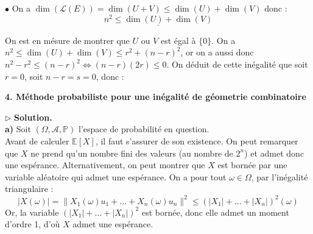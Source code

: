 \documentclass[11pt,a4paper]{article}
\begin{document}
\noindent $\bullet$ On a $\dim(\mathcal{L}(E)) = \dim(U+V) \leqslant \dim(U) + \dim(V)$ donc :
$$ \underline{n^2 \leqslant \dim(U) + \dim(V)} $$

\noindent On est en mésure de montrer que $U$ ou $V$ est égal à $\{0\}$. On a $n^2 \leqslant \dim(U) + \dim(V) \leqslant r^2 + (n-r)^2$, or on a aussi donc $n^2 - r^2 \leqslant (n-r)^2 \Leftrightarrow (n-r)(2r) \leqslant 0$. On déduit de cette inégalité que soit $r=0$, soit $n-r=s=0$, donc :
\begin{center}
\end{center}


\begin{center}

\large \textbf{4. Méthode probabiliste pour une inégalité de géometrie combinatoire}

\end{center}

\vspace{0.2cm}

\noindent{}

\vspace{0.4cm}
\noindent $\triangleright$ \textbf{Solution.} \\
\noindent \textbf{a)} Soit $(\Omega, \mathcal{A}, \mathbb{P})$ l'espace de probabilité en question. \\
Avant de calculer $\mathbb{E}[X]$, il faut s'assurer de son existence. On peut remarquer que $X$ ne prend qu'un nombre fini des valeurs (au nombre de $2^n$) et admet donc une espérance. Alternativement, on peut montrer que $X$ est bornée par une variable aléatoire qui admet une espérance. 
On a pour tout $\omega \in \Omega$, par l'inégalité triangulaire :
$$ |X(\omega)| = \|X_1(\omega)u_1 + \dots + X_n(\omega)u_n\|^2 \leqslant \left(|X_1| + \dots + |X_n|\right)^2(\omega) $$
\noindent Or, la variable $(|X_1| + \dots + |X_n|)^2$ est bornée, donc elle admet un moment d'ordre 1, d'où $X$ admet une espérance.
\end{document}

